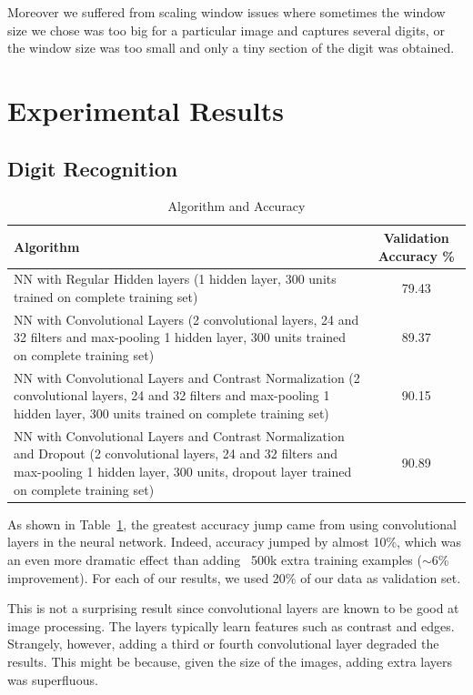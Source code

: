 \documentclass{article} %
\begin{document}
Moreover we suffered from scaling window issues where sometimes the window size we chose was too big for a
particular image and captures several digits, or the window size was too small and only a tiny section of the digit was obtained.

\section{Experimental Results}
\subsection{Digit Recognition}

\begin{center}
\begin{table}[h]
  \begin{tabular}{ | p{10cm} || c ||}
    \hline
    Algorithm & Validation Accuracy \% \\ \hline \hline
    NN with Regular Hidden layers (1 hidden layer, 300 units
trained on complete training set) & 79.43 \\ \hline
NN with Convolutional Layers
(2 convolutional layers, 24 and 32 filters and max-pooling
1 hidden layer, 300 units
trained on complete training set) & 89.37 \\ \hline
NN with Convolutional Layers and Contrast Normalization
(2 convolutional layers, 24 and 32 filters and max-pooling
1 hidden layer, 300 units
trained on complete training set) & 90.15 \\ \hline
NN with Convolutional Layers and Contrast Normalization and Dropout
(2 convolutional layers, 24 and 32 filters and max-pooling
1 hidden layer, 300 units, dropout layer
trained on complete training set) & 90.89 \\ \hline
  \end{tabular}

\caption{Algorithm and Accuracy}
\label{table:algo}
\end{table}
\end{center}

As shown in Table~\ref{table:algo}, the greatest accuracy jump came from using convolutional layers in the neural network. Indeed, accuracy jumped by almost 10\%, which was an even more dramatic effect than adding ~500k extra training examples ($\sim$6\% improvement). For each of our results, we used 20\% of our data as validation set.

This is not a surprising result since convolutional layers are known to be good at image processing. The layers typically learn features such as contrast and edges. Strangely, however, adding a third or fourth convolutional layer degraded the results. This might be because, given the size of the images, adding extra layers was superfluous.
\end{document}
